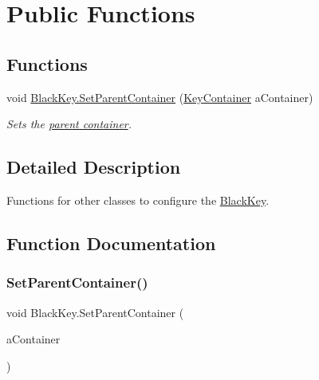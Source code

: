 \hypertarget{group___black_key_pub_func}{}\section{Public Functions}
\label{group___black_key_pub_func}
\subsection*{Functions}
\begin{DoxyCompactItemize}
\item 
void \hyperlink{group___black_key_pub_func_ga49d807a46e36ba19211be329db1cbd2e}{Black\+Key.\+Set\+Parent\+Container} (\hyperlink{class_key_container}{Key\+Container} a\+Container)
\begin{DoxyCompactList}\small\item\em Sets the \hyperlink{group___doc_key_contain}{parent container}. \end{DoxyCompactList}\end{DoxyCompactItemize}


\subsection{Detailed Description}
Functions for other classes to configure the \hyperlink{class_black_key}{Black\+Key}. 

\subsection{Function Documentation}
\mbox{\label{group___black_key_pub_func_ga49d807a46e36ba19211be329db1cbd2e}} 
\subsubsection{\texorpdfstring{Set\+Parent\+Container()}{SetParentContainer()}}
{\footnotesize\ttfamily void Black\+Key.\+Set\+Parent\+Container (\begin{DoxyParamCaption}\item[{\hyperlink{class_key_container}{Key\+Container}}]{a\+Container }\end{DoxyParamCaption})}



